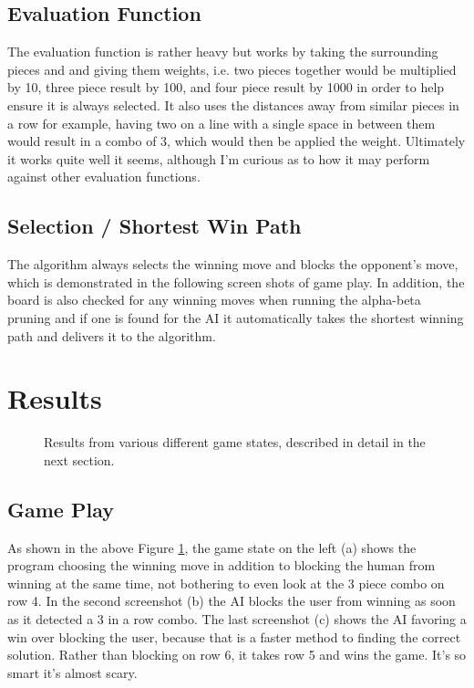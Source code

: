 \documentclass[11pt,letterpaper]{article}
\begin{document}
\subsection{Evaluation Function}
The evaluation function is rather heavy but works by taking the surrounding pieces and and giving them weights, i.e. two pieces together would be multiplied by 10, three piece result by 100, and four piece result by 1000 in order to  help ensure it is always selected.
It also uses the distances away from similar pieces in a row for example, having two on a line with a single space in between them would result in a combo of 3, which would then be applied the weight.
Ultimately it works quite well it seems, although I'm curious as to how it may perform against other evaluation functions.

\subsection{Selection / Shortest Win Path}
The algorithm always selects the winning move and blocks the opponent's move, which is demonstrated in the following screen shots of game play. In addition, the board is also checked for any winning moves when running the alpha-beta pruning and if one is found for the AI it automatically takes the shortest winning path and delivers it to the algorithm.

\section{Results}

\begin{figure}[H]
    \centering
    \qquad
    \qquad
    \caption{Results from various different game states, described in detail in the next section.}
    \label{fig:breadth-first}
\end{figure}

\subsection{Game Play}
As shown in the above Figure \ref{fig:breadth-first}, the game state on the left (a) shows the program choosing the winning move in addition to blocking the human from winning at the same time, not bothering to even look at the 3 piece combo on row 4. In the second screenshot (b) the AI blocks the user from winning as soon as it detected a 3 in a row combo. The last screenshot (c) shows the AI favoring a win over blocking the user, because that is a faster method to finding the correct solution. Rather than blocking on row 6, it takes row 5 and wins the game. It's so smart it's almost scary.
\end{document}
